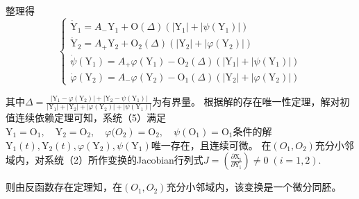 \documentclass[12pt,a4paper,UTF8]{ctexart}
\begin{document}
整理得
\begin{equation}
\left\{\begin{array}{l}
\dot{\mathrm{Y}}_1=A_{-} \mathrm{Y}_1+\mathrm{O}(\Delta)\left(\left|\mathrm{Y}_1\right|+\left|{\psi}\left(\mathrm{Y}_1\right)\right|\right) \\
\dot{\mathrm{Y}}_2=A_{+} \mathrm{Y}_2+\mathrm{O}_2(\Delta)\left(\left|\mathrm{Y}_2\right|+\left|{\varphi}\left(\mathrm{Y}_2\right)\right|\right) \\
\dot{{\psi}}\left(\mathrm{Y}_1\right)=A_{+} {\varphi}\left(\mathrm{Y}_1\right)-\mathrm{O}_2(\Delta)\left(\left|\mathrm{Y}_1\right|+\left|{\psi}\left(\mathrm{Y}_1\right)\right|\right) \\
\dot{{\varphi}}\left(\mathrm{Y}_2\right)=A_{-} {\varphi}\left(\mathrm{Y}_2\right)-\mathrm{O}_1(\Delta)\left(\left|\mathrm{Y}_2\right|+\left|\varphi\left(\mathrm{Y}_2\right)\right|\right)
\end{array}\right.
\end{equation}

其中$\Delta=\frac{\left|\mathrm{Y}_1-{\varphi}\left(\mathrm{Y}_2\right)\right|+\left|\mathrm{Y}_2-\psi\left(\mathrm{Y}_1\right)\right|}{\left|\mathrm{Y}_1\right|+\left|\mathrm{Y}_2\right|+\left|\varphi\left(\mathrm{Y}_2\right)\right|+\left|\psi\left(\mathrm{Y}_1\right)\right|}$为有界量。
根据解的存在唯一性定理，解对初值连续依赖定理可知，系统（5）满足$\left.\mathrm{Y}_1=\mathrm{O}_1, \quad \mathrm{Y}_2=\mathrm{O}_2, \quad \varphi{( O _ { 2 }}\right)=\mathrm{O}_2, \quad \psi\left(\mathrm{O}_1\right)=\mathrm{O}_1$条件的解$\mathrm{Y}_1(t), \mathrm{Y}_2(t), {\varphi}\left(\mathrm{Y}_2\right), {\psi}\left(\mathrm{Y}_1\right)$唯一存在，且连续可微。
在$(O_1,O_2)$充分小邻域内，对系统（2）所作变换的Jacobian行列式$J=\left(\frac{\partial \mathrm{X}_{\mathrm{i}}}{\partial \mathrm{Y}_{\mathrm{i}}}\right)\neq 0\; (i=1,2).$

则由反函数存在定理知，在$(O_1,O_2)$充分小邻域内，该变换是一个微分同胚。
\end{document}
